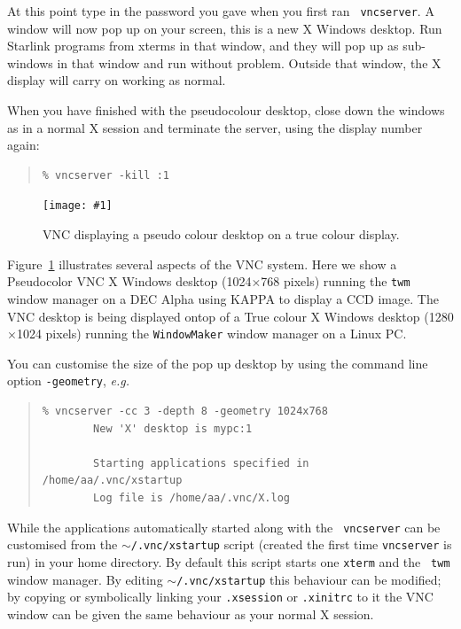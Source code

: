 \documentclass[twoside,11pt]{article}
\newcommand{\htmladdimg}[1]{}
\newcommand{\xref}[3]{#1}
\newcommand{\myfig}[5]{
  \begin{figure}
    \centering\texttt{[image: \#1]}
    \typeout{#1 inserted on page \arabic{page}}
    \caption{\label{#4}#5}
  \end{figure}
  }
\newcommand{\myfig}[5]{
    \label{#4} \htmladdimg{#3}\\
    Figure: #5\\
  }
\begin{document}
At this point type in the password you gave when you first ran {\tt
vncserver}. A window will now pop up on your screen, this is a new X
Windows desktop. Run Starlink programs from xterms in that window, and
they will pop up as sub-windows in that window and run without
problem. Outside that window, the X display will carry on working as
normal.

When you have finished with the pseudocolour desktop, close down the
windows as in a normal X session and terminate the server, using the
display number again:

\small
\begin{quote}
\begin{verbatim}
% vncserver -kill :1
\end{verbatim}
\end{quote}
\normalsize
 \myfig{sc15_vnc.eps}{height=0.45\textheight}{sc15_vnc.gif}{sc15_vnc_example1}{VNC displaying a pseudo colour desktop on a true colour display.}

Figure~\ref{sc15_vnc_example1} illustrates several aspects of the VNC
system. Here we show a Pseudocolor VNC X Windows desktop
(1024$\times$768 pixels) running the {\tt twm} window manager on a DEC
Alpha using \xref{KAPPA}{sun95}{} to display a CCD image. The VNC
desktop is being displayed ontop of a True colour X Windows desktop
(1280$\times$1024 pixels) running the {\tt WindowMaker} window manager
on a Linux PC.

You can customise the size of the pop up desktop by using the command
line option {\tt -geometry}, {\em e.g.\ }

\small
\begin{quote}
\begin{verbatim}
% vncserver -cc 3 -depth 8 -geometry 1024x768
        New 'X' desktop is mypc:1

        Starting applications specified in /home/aa/.vnc/xstartup
        Log file is /home/aa/.vnc/X.log
\end{verbatim}
\end{quote}
\normalsize

While the applications automatically started along with the {\tt
vncserver} can be customised from the {\tt $\sim$/.vnc/xstartup}
script (created the first time {\tt vncserver} is run) in your home
directory. By default this script starts one {\tt xterm} and the {\tt
twm} window manager. By editing {\tt $\sim$/.vnc/xstartup} this
behaviour can be modified; by copying or symbolically linking your
{\tt .xsession} or {\tt .xinitrc} to it the VNC window can be given
the same behaviour as your normal X session.
\end{document}
